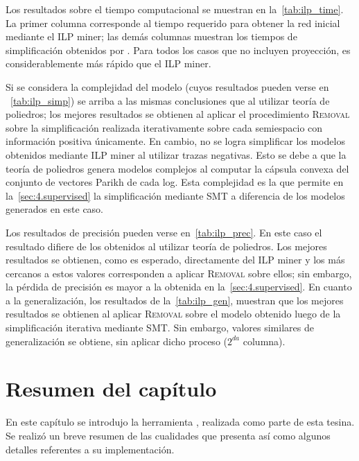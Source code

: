 Los resultados sobre el tiempo computacional se muestran en la~\autoref{tab:ilp_time}.
La primer columna corresponde al tiempo requerido para obtener la red inicial mediante el ILP miner; las demás columnas muestran
los tiempos de simplificación obtenidos por \pachtool. Para todos los casos que no incluyen proyección, \pachtool
es considerablemente más rápido que el ILP miner. %

Si se considera la complejidad del modelo (cuyos resultados pueden verse en ~\autoref{tab:ilp_simp}) se arriba a las mismas
conclusiones que al utilizar teoría de poliedros; los mejores resultados se obtienen
al aplicar el  procedimiento \textsc{Removal} sobre la simplificación realizada iterativamente sobre cada semiespacio
con información positiva únicamente. En cambio, no se logra simplificar
los modelos obtenidos mediante ILP miner al utilizar trazas negativas. Esto se debe a que la teoría de poliedros
genera modelos complejos al computar la cápsula convexa del conjunto de vectores Parikh de cada log. Esta
complejidad es la que permite en la~\autoref{sec:4.supervised} la simplificación mediante SMT a diferencia
de los modelos generados en este caso.




Los resultados de precisión pueden verse en~\autoref{tab:ilp_prec}. En este caso el resultado difiere de los obtenidos
al utilizar teoría de poliedros. Los mejores resultados se obtienen, como es esperado, directamente del ILP miner y los más cercanos
a estos valores corresponden a aplicar \textsc{Removal} sobre ellos; sin embargo, la pérdida de precisión es mayor a la obtenida
en la~\autoref{sec:4.supervised}.
En cuanto a la generalización, los resultados de la~\autoref{tab:ilp_gen}, muestran que los mejores resultados se obtienen
al aplicar \textsc{Removal} sobre el modelo obtenido luego de la simplificación iterativa mediante SMT. Sin embargo, 
valores similares de generalización se obtiene, sin aplicar dicho proceso ($2^{da}$ columna).




\section{Resumen del capítulo}
\label{sec:4.resumen}

En este capítulo se introdujo la herramienta \pachtool, realizada como parte de esta tesina. Se realizó un breve
resumen de las cualidades que presenta así como algunos detalles referentes a su implementación.

